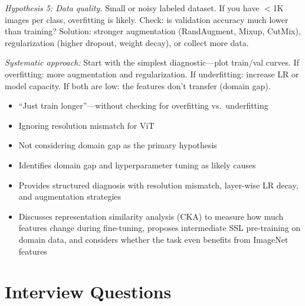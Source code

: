 \begin{interviewq}
\textit{Hypothesis 5: Data quality.} Small or noisy labeled dataset. If you have $<$1K images per class, overfitting is likely. Check: is validation accuracy much lower than training? Solution: stronger augmentation (RandAugment, Mixup, CutMix), regularization (higher dropout, weight decay), or collect more data.

\textit{Systematic approach:} Start with the simplest diagnostic---plot train/val curves. If overfitting: more augmentation and regularization. If underfitting: increase LR or model capacity. If both are low: the features don't transfer (domain gap).

\redflags
\begin{itemize}
    \item ``Just train longer''---without checking for overfitting vs.\ underfitting
    \item Ignoring resolution mismatch for ViT
    \item Not considering domain gap as the primary hypothesis
\end{itemize}


\goodgreat
\begin{itemize}
    \item {} Identifies domain gap and hyperparameter tuning as likely causes
    \item {} Provides structured diagnosis with resolution mismatch, layer-wise LR decay, and augmentation strategies
    \item {} Discusses representation similarity analysis (CKA) to measure how much features change during fine-tuning, proposes intermediate SSL pre-training on domain data, and considers whether the task even benefits from ImageNet features
\end{itemize}

\end{interviewq}

\section{Interview Questions}
\label{sec:vision_interview}

